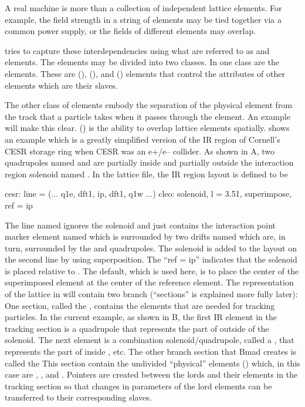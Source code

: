 
A real machine is more than a collection of independent lattice
elements. For example, the field strength in a string of elements may
be tied together via a common power supply, or the fields of different
elements may overlap.

\bmad tries to capture these interdependencies using what are referred
to as  and  elements. The  elements may be
divided into two classes. In one class are the 
elements.  These are  (), 
(), and  () elements that
control the attributes of other elements which are their slaves.

The other class of  elements embody the separation of the
physical element from the track that a particle takes when it passes
through the element. An example will make this clear.
 () is the ability to overlap lattice
elements spatially.  shows an example which is a
greatly simplified version of the IR region of Cornell's CESR storage
ring when CESR was an e+/e-- collider. As shown in A,
two quadrupoles named  and  are partially inside and
partially outside the interaction region solenoid named . In
the lattice file, the IR region layout is defined to be
 {\small
\begin{example}
  cesr: line = (... q1e, dft1, ip, dft1, q1w ...)
  cleo: solenoid, l = 3.51, superimpose, ref = ip
\end{example}
 }
The line named  ignores the solenoid and just contains the
interaction point marker element named  which is surrounded by
two drifts named  which are, in turn, surrounded by the
 and  quadrupoles. The solenoid is added to the layout
on the second line by using superposition. The ``ref = ip'' indicates
that the solenoid is placed relative to . The default, which is
used here, is to place the center of the superimposed 
element at the center of the  reference element.  The
representation of the lattice in \bmad will contain two branch
 (``sections'' is explained more fully later): One
section, called the , contains the elements that
are needed for tracking particles. In the current example, as shown in
B, the first IR element in the tracking section is a
quadrupole that represents the part of  outside of the
solenoid. The next element is a combination solenoid/quadrupole,
called a , that represents the part of  inside
, etc.  The other branch section that Bmad creates is called
the  This section contain the undivided ``physical''
 elements () which, in this case are
, , and . Pointers are created between the
lords and their  elements in the tracking section so
that changes in parameters of the lord elements can be transferred to
their corresponding slaves.

